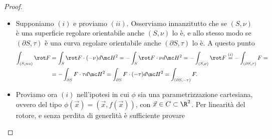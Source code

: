 \begin{proof}
    \begin{itemize}
        \item Supponiamo $(i)$ e proviamo $(ii)$. Osserviamo innanzitutto che se $(S,\nu)$ è una superficie regolare orientabile anche $(S,\nu)$ lo è, e allo stesso modo se $(\partial S,\tau)$ è una curva regolare orientabile anche $(\partial S,\tau)$ lo è. A questo punto
        \[\begin{aligned}\int_{(S,\-nu)}\rot F &= \int_{S}\rot F\cdot (-\nu)d\mc H^2 = -\int_{S}\rot F\cdot \nu d\mc H^2 = -\int_{(S,\nu)}\rot F \overset{(i)}{=} -\int_{(\partial S, \tau)}F  = \\ &= -\int_{\partial S}F\cdot \tau d\mc H^2 = \int_{\partial S}F\cdot (-\tau) d\mc H^2 = \int_{(\partial S, -\tau)} F.\end{aligned}\]
        \item Proviamo ora $(i)$ nell'ipotesi in cui $\phi$ sia una parametrizzazione cartesiana, ovvero del tipo $\phi(\vec x)=(\vec x,f(\vec x))$, con $\vec x\in C\subset \R^2$. Per linearità del rotore, e senza perdita di generlità è sufficiente provare
        

\end{itemize}
\end{proof}
